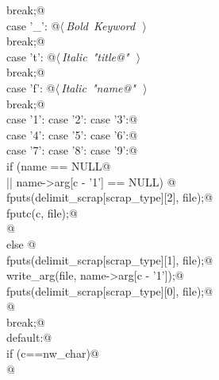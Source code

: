 \documentclass[a4paper]{report}
\begin{document}
\begin{flushleft}
\begin{minipage}{\linewidth}
\begin{list}{}{}
\mbox{}\verb@              break;@\\
\mbox{}\verb@    case '_': @\hbox{$\langle\,${\it Bold Keyword}\nobreak\ {\footnotesize {}}$\,\rangle$}\verb@@\\
\mbox{}\verb@              break;@\\
\mbox{}\verb@    case 't': @\hbox{$\langle\,${\it Italic "\verb@fragment title@"}\nobreak\ {\footnotesize {}}$\,\rangle$}\verb@@\\
\mbox{}\verb@              break;@\\
\mbox{}\verb@    case 'f': @\hbox{$\langle\,${\it Italic "\verb@file name@"}\nobreak\ {\footnotesize {}}$\,\rangle$}\verb@@\\
\mbox{}\verb@              break;@\\
\mbox{}\verb@    case '1': case '2': case '3':@\\
\mbox{}\verb@    case '4': case '5': case '6':@\\
\mbox{}\verb@    case '7': case '8': case '9':@\\
\mbox{}\verb@              if (name == NULL@\\
\mbox{}\verb@                  || name->arg[c - '1'] == NULL) {@\\
\mbox{}\verb@                fputs(delimit_scrap[scrap_type][2], file);@\\
\mbox{}\verb@                fputc(c,   file);@\\
\mbox{}\verb@              }@\\
\mbox{}\verb@              else {@\\
\mbox{}\verb@                fputs(delimit_scrap[scrap_type][1], file);@\\
\mbox{}\verb@                write_arg(file, name->arg[c - '1']);@\\
\mbox{}\verb@                fputs(delimit_scrap[scrap_type][0], file);@\\
\mbox{}\verb@              }@\\
\mbox{}\verb@              break;@\\
\mbox{}\verb@    default:@\\
\mbox{}\verb@          if (c==nw_char)@\\
\mbox{}@\\

\end{list}
\end{minipage}
\end{flushleft}
\end{document}
